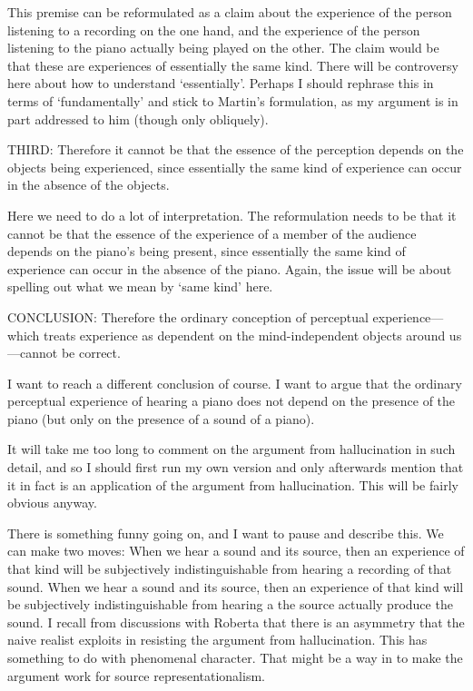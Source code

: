 \documentclass[sloppy, journal, git, bytitle, dodraft]{humapap}
\begin{document}
This premise can be reformulated as a claim about the experience of the person listening to a recording on the one hand, and the experience of the person listening to the piano actually being played on the other. The claim would be that these are experiences of essentially the same kind. There will be controversy here about how to understand `essentially'. Perhaps I should rephrase this in terms of `fundamentally' and stick to Martin's formulation, as my argument is in part addressed to him (though only obliquely).

THIRD: Therefore it cannot be that the essence of the perception depends on the objects being experienced, since essentially the same kind of experience can occur in the absence of the objects.

Here we need to do a lot of interpretation. The reformulation needs to be that it cannot be that the essence of the experience of a member of the audience depends on the piano's being present, since essentially the same kind of experience can occur in the absence of the piano. Again, the issue will be about spelling out what we mean by `same kind' here.

CONCLUSION: Therefore the ordinary conception of perceptual experience—which treats experience as dependent on the mind-independent objects around us—cannot be correct.

I want to reach a different conclusion of course. I want to argue that the ordinary perceptual experience of hearing a piano does not depend on the presence of the piano (but only on the presence of a sound of a piano). 

It will take me too long to comment on the argument from hallucination in such detail, and so I should first run my own version and only afterwards mention that it in fact is an application of the argument from hallucination. This will be fairly obvious anyway.

There is something funny going on, and I want to pause and describe this. We can make two moves: 
When we hear a sound and its source, then an experience of that kind will be subjectively indistinguishable from hearing  a recording of that sound. 
When we hear a sound and its source, then an experience of that kind will be subjectively indistinguishable from hearing a the source actually produce the sound.
I recall from discussions with Roberta that there is an asymmetry that the naive realist exploits in resisting the argument from hallucination. This has something to do with phenomenal character. That might be a way in to make the argument work for source representationalism. 
\end{document}
